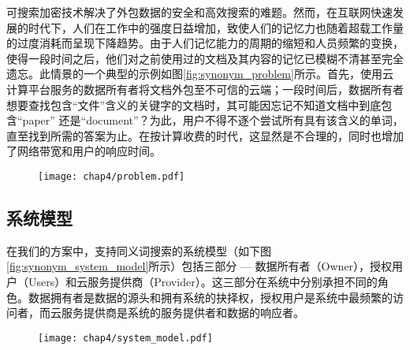 可搜索加密技术解决了外包数据的安全和高效搜索的难题。然而，在互联网快速发展的时代下，人们在工作中的强度日益增加，致使人们的记忆力也随着超载工作量的过度消耗而呈现下降趋势。由于人们记忆能力的周期的缩短和人员频繁的变换，使得一段时间之后，他们对之前使用过的文档及其内容的记忆已模糊不清甚至完全遗忘。此情景的一个典型的示例如图\ref{fig:synonym_problem}所示。首先，使用云计算平台服务的数据所有者将文档外包至不可信的云端；一段时间后，数据所有者想要查找包含“文件”含义的关键字的文档时，其可能因忘记不知道文档中到底包含“paper” 还是“document”？为此，用户不得不逐个尝试所有具有该含义的单词，直至找到所需的答案为止。在按计算收费的时代，这显然是不合理的，同时也增加了网络带宽和用户的响应时间。%
\begin{figure}[!htp]
 \centering
 \texttt{[image: chap4/problem.pdf]}
\end{figure}



\subsection{系统模型}
\label{sec:synonym_model_system_model}

在我们的方案中，支持同义词搜索的系统模型（如下图\ref{fig:synonym_system_model}所示）包括三部分 --- 数据所有者（Owner），授权用户（Users）和云服务提供商（Provider）。这三部分在系统中分别承担不同的角色。数据拥有者是数据的源头和拥有系统的抉择权，授权用户是系统中最频繁的访问者，而云服务提供商是系统的服务提供者和数据的响应者。
\begin{figure}[!htp]
 \centering
 \texttt{[image: chap4/system\_model.pdf]}
\end{figure}


